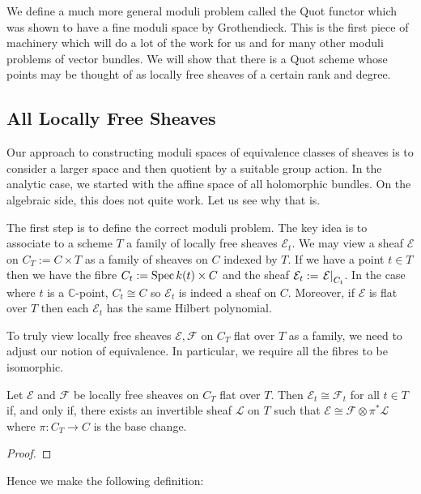 \documentclass[12pt]{ociamthesis}  %
\begin{document}
We define a much more general moduli problem called
the Quot functor which was shown to have a fine moduli space by
Grothendieck. This is the first piece of machinery which will do a
lot of the work for us and for many other moduli problems of vector
bundles. We will show that there is a Quot scheme whose points
may be thought of as locally free sheaves of a certain rank and
degree.

\subsection{All Locally Free Sheaves}

Our approach to constructing moduli spaces of equivalence classes of
sheaves is to consider a larger space and then quotient by a suitable
group action. In the analytic case, we started with the affine space of
all holomorphic bundles. On the algebraic side, this does not quite work.
Let us see why that is.

The first step is to define the correct moduli problem. The key idea
is to associate to a scheme $T$ a family of locally free sheaves
$\mathcal E_t$. We may view a sheaf $\mathcal E$ on $C_T := C\times T$
as a family of sheaves on $C$ indexed by $T$. If we have a point $t\in T$
then we have the fibre $C_t := \operatorname{Spec} k(t) \times C$ and the sheaf
$\mathcal E_t := \left.{\mathcal E}\right\vert_{C_t}$. In the case where
$t$ is a $\mathbb{C}$-point, $C_t \cong C$ so $\mathcal E_t$ is indeed
a sheaf on $C$. Moreover, if $\mathcal E$ is flat over $T$ then
each $\mathcal E_t$ has the same Hilbert polynomial.

To truly view locally free sheaves $\mathcal E,\mathcal F$ on
$C_T$ flat over $T$ as a family, we need to adjust our notion of
equivalence. In particular, we require all the fibres to be isomorphic.

\begin{lemma}
  Let $\mathcal E$ and $\mathcal F$ be locally free sheaves on $C_T$
  flat over $T$. Then $\mathcal E_t\cong\mathcal F_t$ for all $t\in T$
  if, and only if, there exists an invertible sheaf $\mathcal L$ on
  $T$ such that $\mathcal E \cong \mathcal F \otimes \pi^*\mathcal L$
  where $\pi : C_T \to C$ is the base change.
  \begin{proof}
    \missingproof
  \end{proof}
\end{lemma}

Hence we make the following definition:
\end{document}
